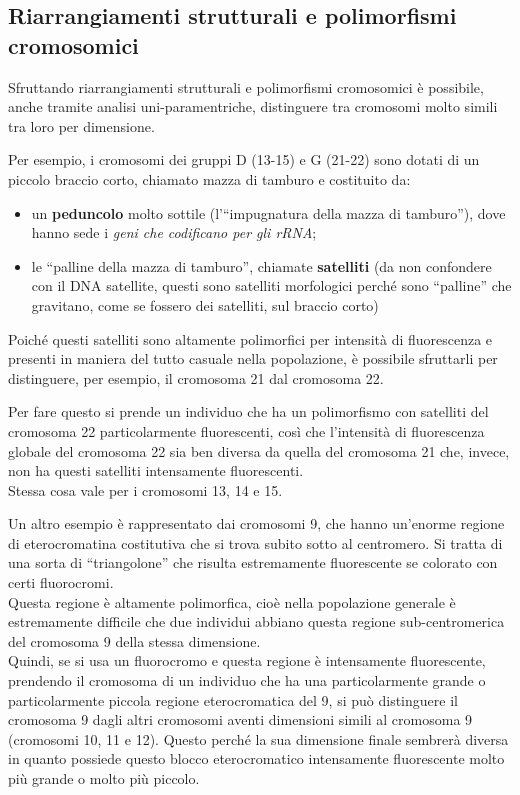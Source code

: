 \documentclass[11pt]{book}
\begin{document}
\subsection{Riarrangiamenti strutturali e polimorfismi cromosomici}
Sfruttando riarrangiamenti strutturali e polimorfismi cromosomici è possibile, anche tramite analisi uni-paramentriche, distinguere tra cromosomi molto simili tra loro per dimensione.

Per esempio, i cromosomi dei gruppi D (13-15) e G (21-22) sono dotati di un piccolo braccio corto, chiamato mazza di tamburo e costituito da:
\begin{itemize}
\item un \textbf{peduncolo} molto sottile (l'``impugnatura della mazza di tamburo''), dove hanno sede i \emph{geni che codificano per gli rRNA}; 
\item le ``palline della mazza di tamburo'', chiamate \textbf{satelliti} (da non confondere con il DNA satellite, questi sono satelliti morfologici perché sono ``palline'' che gravitano, come se fossero dei satelliti, sul braccio corto)
\end{itemize}

Poiché questi satelliti sono altamente polimorfici per intensità di fluorescenza e presenti in maniera del tutto casuale nella popolazione, è possibile sfruttarli per distinguere, per esempio, il cromosoma 21 dal cromosoma 22.

Per fare questo si prende un individuo che ha un polimorfismo con satelliti del cromosoma 22 particolarmente fluorescenti, così che l’intensità di fluorescenza globale del cromosoma 22 sia ben diversa da quella del cromosoma 21 che, invece, non ha questi satelliti intensamente fluorescenti.\\
Stessa cosa vale per i cromosomi 13, 14 e 15.

Un altro esempio è rappresentato dai cromosomi 9, che hanno un’enorme regione di eterocromatina costitutiva che si trova subito sotto al centromero. Si tratta di una sorta di ``triangolone'' che risulta estremamente fluorescente se colorato con certi fluorocromi.\\
Questa regione è altamente polimorfica, cioè nella popolazione generale è estremamente difficile che due individui abbiano questa regione sub-centromerica del cromosoma 9 della stessa dimensione.\\
Quindi, se si usa un fluorocromo e questa regione è intensamente fluorescente, prendendo il cromosoma di un individuo che ha una particolarmente grande o particolarmente piccola regione eterocromatica del 9, si può distinguere il cromosoma 9 dagli altri cromosomi aventi dimensioni simili al cromosoma 9 (cromosomi 10, 11 e 12). Questo perché la sua dimensione finale sembrerà diversa in quanto possiede questo blocco eterocromatico intensamente fluorescente molto più grande o molto più piccolo.
\end{document}
